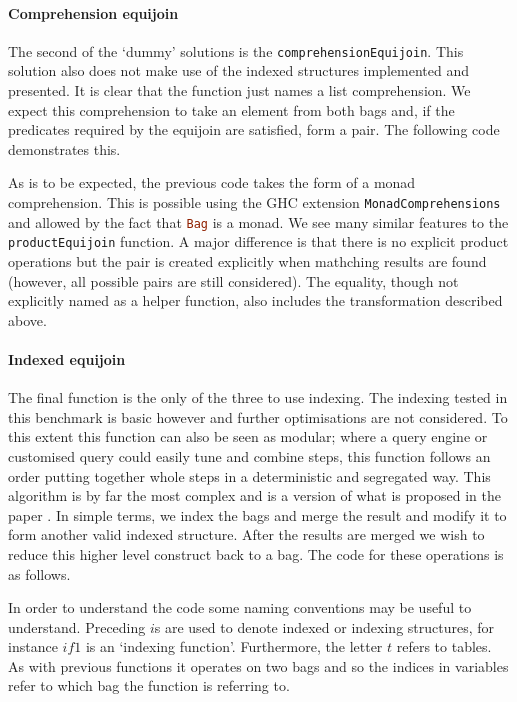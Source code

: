 \paragraph{Comprehension equijoin} The second of the `dummy' solutions is the
\lstinline[language=Haskell]{comprehensionEquijoin}.
This solution also does not make use of the indexed structures implemented and
presented. It is
clear that the function just names a list comprehension. We expect this
comprehension to take an element from both bags and, if the predicates required
by the equijoin are satisfied, form a pair. The following code demonstrates
this.



\noindent
As is to be expected, the previous code takes the form of a monad comprehension.
This is possible using the GHC extension \verb|MonadComprehensions| and allowed by
the fact that \lstinline[language=Haskell]{Bag} is a monad. We see many similar
features to the \lstinline[language=Haskell]{productEquijoin} function. A major difference is that there is
no explicit product operations but the pair is created explicitly when mathching
results are found (however, all possible pairs are still considered). The equality, though
not explicitly named as a helper function, also includes the transformation described above.

\paragraph{Indexed equijoin} The final function is the only of the three to use
indexing. The indexing tested in this benchmark is basic however and further
optimisations are not considered. To this extent this function can also be seen as
modular; where a query engine or
customised query could easily tune and combine steps, this function follows an
order putting together whole steps in a deterministic and segregated way.
This algorithm is by far
the most complex and is a version of what is proposed in the paper \relalg{}. In
simple terms, we index the bags and merge the result and modify it to form
another valid indexed
structure. After the results are
merged we wish to reduce this higher level construct back to a bag. The code for
these operations is as follows.



\noindent
In order to understand the code some naming conventions may be useful to
understand. Preceding $i$s are used to denote indexed or indexing structures,
for instance $if1$ is an `indexing function'. Furthermore, the letter $t$
refers to tables. As with previous functions it operates on two bags and
so the indices in variables refer to which bag the function is referring to.

